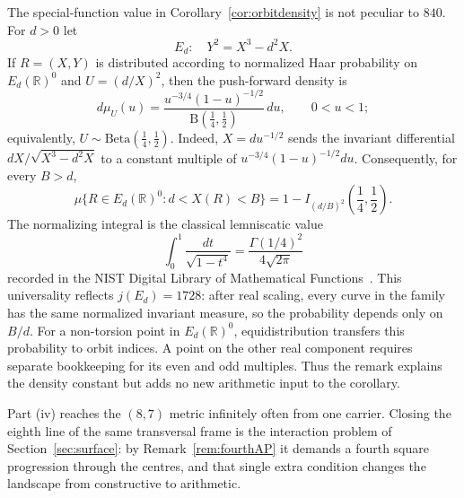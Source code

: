 \begin{remark}
The special-function value in Corollary~\ref{cor:orbitdensity} is not
peculiar to $840$. For $d>0$ let
\[
E_d:\quad Y^2=X^3-d^2X.
\]
If $R=(X,Y)$ is distributed according to normalized Haar probability on
$E_d(\mathbb R)^0$ and $U=(d/X)^2$, then the push-forward density is
\[
 d\mu_U(u)=
 \frac{u^{-3/4}(1-u)^{-1/2}}
 {\mathrm B(\tfrac14,\tfrac12)}\,du,
 \qquad 0<u<1;
\]
equivalently, $U\sim\mathrm{Beta}(\tfrac14,\tfrac12)$. Indeed,
$X=du^{-1/2}$ sends the invariant differential
$dX/\sqrt{X^3-d^2X}$ to a constant multiple of
$u^{-3/4}(1-u)^{-1/2}du$. Consequently, for every $B>d$,
\[
 \mu\{R\in E_d(\mathbb R)^0:d<X(R)<B\}
 =1-I_{(d/B)^2}\!\left(\frac14,\frac12\right).
\]
The normalizing integral is the classical lemniscatic value
\[
 \int_0^1\frac{dt}{\sqrt{1-t^4}}
 =\frac{\Gamma(1/4)^2}{4\sqrt{2\pi}}
\]
recorded in the NIST Digital Library of Mathematical
Functions~\cite[\S19.20(i), Eq.~(19.20.2)]{DLMF}. This universality reflects
$j(E_d)=1728$: after real scaling, every curve in the family has the same
normalized invariant measure, so the probability depends only on $B/d$.
For a non-torsion point in $E_d(\mathbb R)^0$, equidistribution transfers
this probability to orbit indices. A point on the other real component
requires separate bookkeeping for its even and odd multiples. Thus the
remark explains the density constant but adds no new arithmetic input to
the corollary.
\end{remark}

\begin{remark}
Part (iv) reaches the $(8,7)$ metric infinitely often from one carrier.
Closing the eighth line of the same transversal frame is the interaction
problem of Section~\ref{sec:surface}: by Remark~\ref{rem:fourthAP} it
demands a fourth square progression through the centres,
and that single extra condition changes the landscape from constructive to
arithmetic.
\end{remark}
